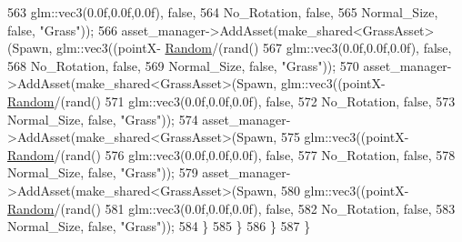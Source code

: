 \begin{DoxyCode}
563                                                             glm::vec3(0.0f,0.0f,0.0f), \textcolor{keyword}{false},
564                                                             No\_Rotation, \textcolor{keyword}{false},
565                                                             Normal\_Size, \textcolor{keyword}{false}, \textcolor{stringliteral}{"Grass"}));            
566             asset\_manager->AddAsset(make\_shared<GrassAsset>(Spawn, glm::vec3((pointX-
      \hyperlink{class_game_world_a56652cc9880b3ba1be61395066c863c3}{Random}/(rand() %
567                                                             glm::vec3(0.0f,0.0f,0.0f), \textcolor{keyword}{false},
568                                                             No\_Rotation, \textcolor{keyword}{false},
569                                                             Normal\_Size, \textcolor{keyword}{false}, \textcolor{stringliteral}{"Grass"}));
570             asset\_manager->AddAsset(make\_shared<GrassAsset>(Spawn, glm::vec3((pointX-
      \hyperlink{class_game_world_a56652cc9880b3ba1be61395066c863c3}{Random}/(rand() %
571                                                             glm::vec3(0.0f,0.0f,0.0f), \textcolor{keyword}{false},
572                                                             No\_Rotation, \textcolor{keyword}{false},
573                                                             Normal\_Size, \textcolor{keyword}{false}, \textcolor{stringliteral}{"Grass"}));
574             asset\_manager->AddAsset(make\_shared<GrassAsset>(Spawn,
575                                                             glm::vec3((pointX-
      \hyperlink{class_game_world_a56652cc9880b3ba1be61395066c863c3}{Random}/(rand() %
576                                                             glm::vec3(0.0f,0.0f,0.0f), \textcolor{keyword}{false},
577                                                             No\_Rotation, \textcolor{keyword}{false},
578                                                             Normal\_Size, \textcolor{keyword}{false}, \textcolor{stringliteral}{"Grass"}));
579             asset\_manager->AddAsset(make\_shared<GrassAsset>(Spawn,
580                                                             glm::vec3((pointX-
      \hyperlink{class_game_world_a56652cc9880b3ba1be61395066c863c3}{Random}/(rand() %
581                                                             glm::vec3(0.0f,0.0f,0.0f), \textcolor{keyword}{false},
582                                                             No\_Rotation, \textcolor{keyword}{false},
583                                                             Normal\_Size, \textcolor{keyword}{false}, \textcolor{stringliteral}{"Grass"}));
584    \}
585   \}
586  \}
587 \}
\end{DoxyCode}



